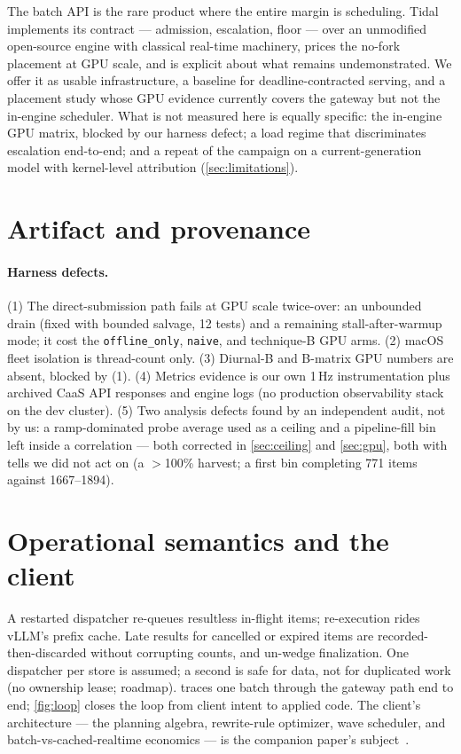 \documentclass[11pt]{article}
\newcommand{\code}[1]{\texttt{#1}}
\begin{document}
The batch API is the rare product where the entire margin is scheduling. Tidal
implements its contract --- admission, escalation, floor --- over an unmodified
open-source engine with classical real-time machinery, prices the no-fork placement at
GPU scale, and is explicit about what remains undemonstrated. We offer it as usable
infrastructure, a baseline for deadline-contracted serving, and a placement study whose
GPU evidence currently covers the gateway but not the in-engine scheduler. What is not
measured here is equally specific: the in-engine GPU matrix, blocked by our harness
defect; a load regime that discriminates escalation end-to-end; and a repeat of the
campaign on a current-generation model with kernel-level attribution
(\cref{sec:limitations}).

\FloatBarrier
\appendix

\section{Artifact and provenance}
\label{app:provenance}

\paragraph{Harness defects.} (1) The direct-submission path fails at GPU scale
twice-over: an unbounded drain (fixed with bounded salvage, 12 tests) and a remaining
stall-after-warmup mode; it cost the \code{offline\_only}, \code{naive}, and technique-B
GPU arms. (2) macOS fleet isolation is thread-count only. (3) Diurnal-B and B-matrix GPU
numbers are absent, blocked by (1). (4) Metrics evidence is our own 1\,Hz
instrumentation plus archived CaaS API responses and engine logs (no production
observability stack on the dev cluster). (5) Two analysis defects found by an
independent audit, not by us: a ramp-dominated probe average used as a ceiling and a
pipeline-fill bin left inside a correlation --- both corrected in \cref{sec:ceiling} and
\cref{sec:gpu}, both with tells we did not act on (a $>$100\% harvest; a first bin
completing 771 items against 1667--1894).

\section{Operational semantics and the client}
\label{app:ops}

A restarted dispatcher re-queues resultless in-flight items; re-execution rides vLLM's
prefix cache. Late results for cancelled or expired items are recorded-then-discarded
without corrupting counts, and un-wedge finalization. One dispatcher per store is
assumed; a second is safe for data, not for duplicated work (no ownership lease;
roadmap).  traces one batch through the gateway path end to end;
\cref{fig:loop} closes the loop from client intent to applied code. The client's
architecture --- the planning algebra, rewrite-rule optimizer, wave scheduler, and
batch-vs-cached-realtime economics --- is the companion paper's
subject~\citep{lazycode-paper}.
\end{document}
